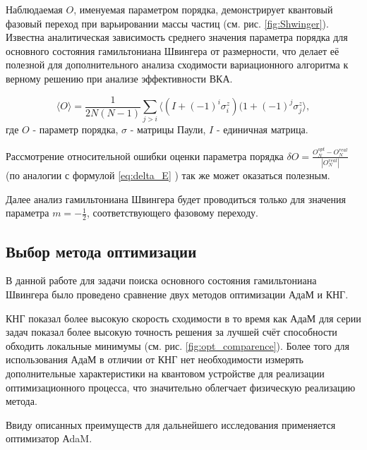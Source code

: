\documentclass[14pt]{extarticle}
\begin{document}
\qquad Наблюдаемая $O$, именуемая параметром порядка, демонстрирует квантовый фазовый переход при варьировании массы частиц (см. рис. \ref{fig:Shwinger}). Известна аналитическая зависимость среднего значения параметра порядка для основного состояния гамильтониана Швингера от размерности, что делает её полезной для дополнительного анализа сходимости вариационного алгоритма к верному решению при анализе эффективности ВКА.

\begin{equation}
\langle O \rangle = \frac{1}{2N(N-1)}\sum_{j>i} \langle (I+(-1)^i \sigma^{z}_{i}) ( 1 + (-1)^{j} \sigma^{z}_{j} \rangle,
\end{equation} где $O$ - параметр порядка,  $\sigma$ - матрицы Паули, $I$ - единичная матрица.

\qquad Рассмотрение относительной ошибки оценки параметра порядка $\delta O = \frac{O^{opt}_N - O^{real}_N}{|O^{real}_N|}$  (по аналогии с формулой \eqref{eq:delta_E}  ) так же может оказаться полезным.

\qquad Далее анализ гамильтониана Швингера будет проводиться только для значения параметра $m=-\frac{1}{2}$, соответствующего фазовому переходу.


\subsection{Выбор метода оптимизации}

\qquad В данной работе для задачи поиска основного состояния гамильтониана Швингера было проведено сравнение двух методов оптимизации АдаМ и КНГ. 

\qquad КНГ показал более высокую скорость сходимости в то время как АдаМ для серии задач показал более высокую точность решения за лучшей счёт способности обходить локальные минимумы (см. рис. \ref{fig:opt_comparence}). Более того для использования АдаМ в отличии от КНГ нет необходимости измерять дополнительные характеристики на квантовом устройстве для реализации оптимизационного процесса, что значительно облегчает физическую реализацию метода.

\qquad Ввиду описанных преимуществ для дальнейшего исследования применяется оптимизатор АdaM.
\end{document}

